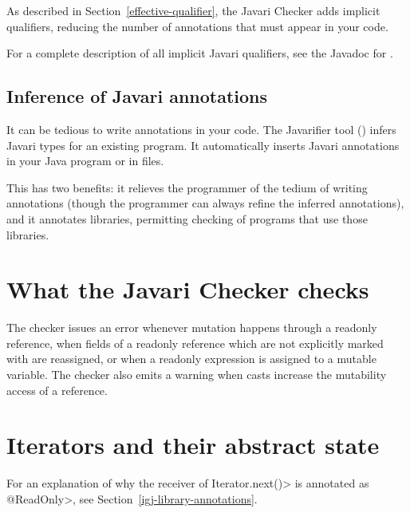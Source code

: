 As described in Section~\ref{effective-qualifier}, the Javari Checker
adds implicit qualifiers, reducing the number of annotations that must
appear in your code.

For a complete description of all implicit Javari qualifiers, see the
Javadoc for .


\subsection{Inference of Javari annotations\label{javari-inference}}

It can be tedious to write annotations in your code.  The Javarifier tool
() infers 
Javari types for an existing program.  It 
automatically inserts Javari annotations in your Java program or
in  files.

This has two benefits:  it relieves the programmer of the tedium of writing
annotations (though the programmer can always refine the inferred
annotations), and it annotates libraries, permitting checking of programs
that use those libraries.



\section{What the Javari Checker checks\label{javari-checks}}

The checker issues an error whenever mutation happens through a readonly
reference, when fields of a readonly reference which are not explicitly
marked with  are reassigned, or
when a readonly expression is assigned to a mutable variable.  The checker
also emits a warning when casts increase the mutability access of a
reference.



\section{Iterators and their abstract state\label{javari-library-annotations}}

For an explanation of why the receiver of \<Iterator.next()> is annotated
as \<@ReadOnly>, see Section~\ref{igj-library-annotations}.


